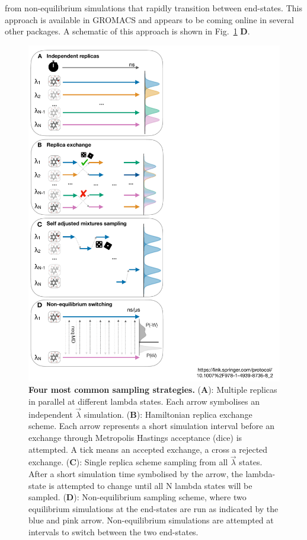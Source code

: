 \documentclass[9pt,bestpractices]{livecoms}
\begin{document}
from non-equilibrium simulations that rapidly transition between end-states. This approach is available in GROMACS and appears to be coming online in several other packages. A schematic of this approach is shown in Fig.~\ref{fig:fig_sampling_scheme} \textbf{D}. 

\begin{figure}
    \includegraphics[width=0.88\columnwidth]{figures/fig8_sampl_scheme/Figure.pdf}
    \caption{\textbf{Four most common sampling strategies.} (\textbf{A}): Multiple replicas in parallel at different lambda states. Each arrow symbolises an independent $\vec{\lambda}$ simulation. (\textbf{B}): Hamiltonian replica exchange scheme. Each arrow represents a short simulation interval before an exchange through Metropolis Hastings acceptance (dice) is attempted. A tick means an accepted exchange, a cross a rejected exchange. (\textbf{C}): Single replica scheme sampling from all $\vec{\lambda}$ states. After a short simulation time symbolised by the arrow, the lambda-state is attempted to change until all N lambda states will be sampled. (\textbf{D}): Non-equilibrium sampling scheme, where two equilibrium simulations at the end-states are run as indicated by the blue and pink arrow. Non-equilibrium simulations are attempted at intervals to switch between the two end-states.}
    \label{fig:fig_sampling_scheme}
\end{figure} 
\end{document}
